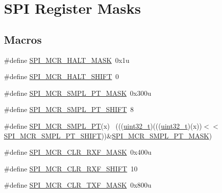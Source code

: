 \hypertarget{group___s_p_i___register___masks}{}\section{S\+PI Register Masks}
\label{group___s_p_i___register___masks}
\subsection*{Macros}
\begin{DoxyCompactItemize}
\item 
\#define \hyperlink{group___s_p_i___register___masks_ga88c670302548b2d5b5f032b5709bc366}{S\+P\+I\+\_\+\+M\+C\+R\+\_\+\+H\+A\+L\+T\+\_\+\+M\+A\+SK}~0x1u
\item 
\#define \hyperlink{group___s_p_i___register___masks_ga8f13f49cf8502462271d8a179338d81b}{S\+P\+I\+\_\+\+M\+C\+R\+\_\+\+H\+A\+L\+T\+\_\+\+S\+H\+I\+FT}~0
\item 
\#define \hyperlink{group___s_p_i___register___masks_gaebb0539e04af465a39892f5aaabc872d}{S\+P\+I\+\_\+\+M\+C\+R\+\_\+\+S\+M\+P\+L\+\_\+\+P\+T\+\_\+\+M\+A\+SK}~0x300u
\item 
\#define \hyperlink{group___s_p_i___register___masks_ga1ffc13b9075cc6b0b34ea3162d6c1b74}{S\+P\+I\+\_\+\+M\+C\+R\+\_\+\+S\+M\+P\+L\+\_\+\+P\+T\+\_\+\+S\+H\+I\+FT}~8
\item 
\#define \hyperlink{group___s_p_i___register___masks_ga5c2964171c6cf43a92d15e15373ed2ae}{S\+P\+I\+\_\+\+M\+C\+R\+\_\+\+S\+M\+P\+L\+\_\+\+PT}(x)                                          ~(((\hyperlink{_p_e___types_8h_a33594304e786b158f3fb30289278f5af}{uint32\+\_\+t})(((\hyperlink{_p_e___types_8h_a33594304e786b158f3fb30289278f5af}{uint32\+\_\+t})(x))$<$$<$\hyperlink{group___s_p_i___register___masks_ga1ffc13b9075cc6b0b34ea3162d6c1b74}{S\+P\+I\+\_\+\+M\+C\+R\+\_\+\+S\+M\+P\+L\+\_\+\+P\+T\+\_\+\+S\+H\+I\+FT}))\&\hyperlink{group___s_p_i___register___masks_gaebb0539e04af465a39892f5aaabc872d}{S\+P\+I\+\_\+\+M\+C\+R\+\_\+\+S\+M\+P\+L\+\_\+\+P\+T\+\_\+\+M\+A\+SK})
\item 
\#define \hyperlink{group___s_p_i___register___masks_gaedd370380f06f2e4bf2ca01babda8732}{S\+P\+I\+\_\+\+M\+C\+R\+\_\+\+C\+L\+R\+\_\+\+R\+X\+F\+\_\+\+M\+A\+SK}~0x400u
\item 
\#define \hyperlink{group___s_p_i___register___masks_gae1f4b01eb27f199a893e42f6a3d3edb7}{S\+P\+I\+\_\+\+M\+C\+R\+\_\+\+C\+L\+R\+\_\+\+R\+X\+F\+\_\+\+S\+H\+I\+FT}~10
\item 
\#define \hyperlink{group___s_p_i___register___masks_ga5b57559246a1a4c32c53542e9f0ea2cb}{S\+P\+I\+\_\+\+M\+C\+R\+\_\+\+C\+L\+R\+\_\+\+T\+X\+F\+\_\+\+M\+A\+SK}~0x800u
$$
\end{DoxyCompactItemize}
